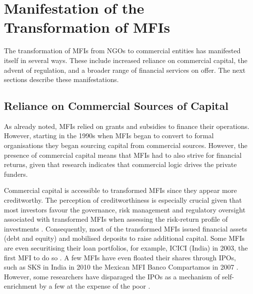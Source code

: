 \documentclass[a4paper, nobind]{templates/ociamthesis}
\begin{document}
\hypertarget{manifestation-of-the-transformation-of-mfis}{%
\section{Manifestation of the Transformation of MFIs}\label{manifestation-of-the-transformation-of-mfis}}

\noindent The transformation of MFIs from NGOs to commercial entities has manifested itself in several ways. These include increased reliance on commercial capital, the advent of regulation, and a broader range of financial services on offer. The next sections describe these manifestations.

\hypertarget{reliance-on-commercial-sources-of-capital}{%
\subsection{Reliance on Commercial Sources of Capital}\label{reliance-on-commercial-sources-of-capital}}

\noindent As already noted, MFIs relied on grants and subsidies to finance their operations. However, starting in the 1990s when MFIs began to convert to formal organisations they began sourcing capital from commercial sources. However, the presence of commercial capital means that MFIs had to also strive for financial returns, given that research indicates that commercial logic drives the private funders.

Commercial capital is accessible to transformed MFIs since they appear more creditworthy. The perception of creditworthiness is especially crucial given that most investors favour the governance, risk management and regulatory oversight associated with transformed MFIs when assessing the risk-return profile of investments \autocite{frank2008stemming}. Consequently, most of the transformed MFIs issued financial assets (debt and equity) and mobilised deposits to raise additional capital. Some MFIs are even securitising their loan portfolios, for example, ICICI (India) in 2003, the first MFI to do so \autocite{dieckmann2007microfinance}. A few MFIs have even floated their shares through IPOs, such as SKS in India in 2010 \autocite{chen2010indian} the Mexican MFI Banco Compartamos in 2007 \autocite{ashta2012compartamos}. However, some researchers have disparaged the IPOs as a mechanism of self-enrichment by a few at the expense of the poor \autocite{ghosh2013microfinance}.
\end{document}
